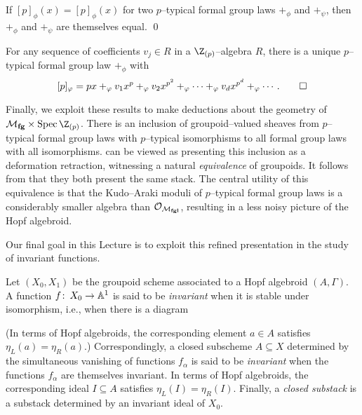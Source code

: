 \begin{corollary}\label{PSeriesDetermines}
If $[p]_\phi(x) = [p]_\phi(x)$ for two $p$--typical formal group laws $+_\phi$ and $+_\psi$, then $+_\phi$ and $+_\psi$ are themselves equal. \qed
\end{corollary}

\begin{corollary}\label{EveryPSeriesArises}
For any sequence of coefficients $v_j \in R$ in a $\Z_{(p)}$--algebra $R$, there is a unique $p$--typical formal group law $+_\phi$ with \[[p]_\phi = px +_\phi v_1 x^p +_\phi v_2 x^{p^2} +_\phi \cdots +_\phi v_d x^{p^d} +_\phi \cdots. \qed\]
\end{corollary}

Finally, we exploit these results to make deductions about the geometry of $\moduli{fg} \times \Spec \Z_{(p)}$.  There is an inclusion of groupoid--valued sheaves from $p$--typical formal group laws with $p$--typical isomorphisms to all formal group laws with all isomorphisms.   can be viewed as presenting this inclusion as a deformation retraction, witnessing a natural \emph{equivalence} of groupoids.  It follows from  that they both present the same stack.  The central utility of this equivalence is that the Kudo--Araki moduli of $p$--typical formal group laws is a considerably smaller algebra than $\sheaf O_{\moduli{fgl}}$, resulting in a less noisy picture of the Hopf algebroid.

Our final goal in this Lecture is to exploit this refined presentation in the study of invariant functions.
\begin{definition}\label{DefnClosedSubstack}
Let $(X_0, X_1)$ be the groupoid scheme associated to a Hopf algebroid $(A, \Gamma)$.  A function $f\co X_0 \to \mathbb A^1$ is said to be \textit{invariant} when it is stable under isomorphism, i.e., when there is a diagram
\begin{center}
\end{center}
(In terms of Hopf algebroids, the corresponding element $a \in A$ satisfies $\eta_L(a) = \eta_R(a)$.)  Correspondingly, a closed subscheme $A \subseteq X$ determined by the simultaneous vanishing of functions $f_\alpha$ is said to be \textit{invariant} when the functions $f_\alpha$ are themselves invariant.  In terms of Hopf algebroids, the corresponding ideal $I \subseteq A$ satisfies $\eta_L(I) = \eta_R(I)$.  Finally, a \textit{closed substack} is a substack determined by an invariant ideal of $X_0$.
\end{definition}

